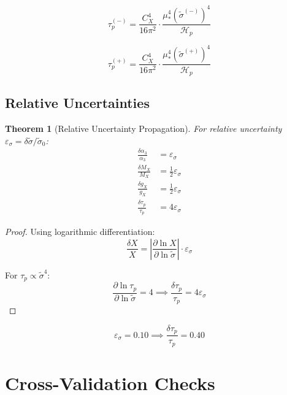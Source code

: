 \documentclass[11pt,letterpaper]{article}
\newtheorem{theorem}{Theorem}[section]
\newcommand{\st}{\tilde{\sigma}}
\newcommand{\eps}{\varepsilon}
\newcommand{\Hp}{\mathcal{H}_p}
\begin{document}
\begin{equation}
\tau_p^{(-)} = \frac{C_X^4}{16\pi^2} \cdot \frac{\mu_*^4 (\st^{(-)})^4}{\Hp}
\label{eq:taup-lower}
\end{equation}

\begin{equation}
\tau_p^{(+)} = \frac{C_X^4}{16\pi^2} \cdot \frac{\mu_*^4 (\st^{(+)})^4}{\Hp}
\label{eq:taup-upper}
\end{equation}

\subsection{Relative Uncertainties}
\label{app:relative-unc}

\begin{theorem}[Relative Uncertainty Propagation]
\label{thm:relative-unc}
For relative uncertainty $\eps_\sigma = \delta\st/\st_0$:
\begin{align}
\frac{\delta\alpha_3}{\alpha_3} &= \eps_\sigma \label{eq:rel-alpha3} \\
\frac{\delta M_X}{M_X} &= \frac{1}{2}\eps_\sigma \label{eq:rel-mx} \\
\frac{\delta g_X}{g_X} &= \frac{1}{2}\eps_\sigma \label{eq:rel-gx} \\
\frac{\delta\tau_p}{\tau_p} &= 4\eps_\sigma \label{eq:rel-taup}
\end{align}
\end{theorem}

\begin{proof}
Using logarithmic differentiation:
\begin{equation}
\frac{\delta X}{X} = \left|\frac{\partial \ln X}{\partial \ln \st}\right| \cdot \eps_\sigma
\label{eq:log-diff}
\end{equation}

For $\tau_p \propto \st^4$:
\begin{equation}
\frac{\partial \ln \tau_p}{\partial \ln \st} = 4 \implies \frac{\delta\tau_p}{\tau_p} = 4\eps_\sigma
\label{eq:taup-rel-unc}
\end{equation}
\end{proof}

\begin{equation}
\eps_\sigma = 0.10 \implies \frac{\delta\tau_p}{\tau_p} = 0.40
\label{eq:example-propagation}
\end{equation}

\section{Cross-Validation Checks}
\label{app:cross-validation}
\end{document}
